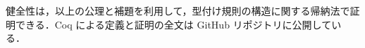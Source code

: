 健全性は，以上の公理と補題を利用して，型付け規則の構造に関する帰納法で証明できる．Coq による定義と証明の全文は GitHub リポジトリ\cite[api]{api}に公開している．











